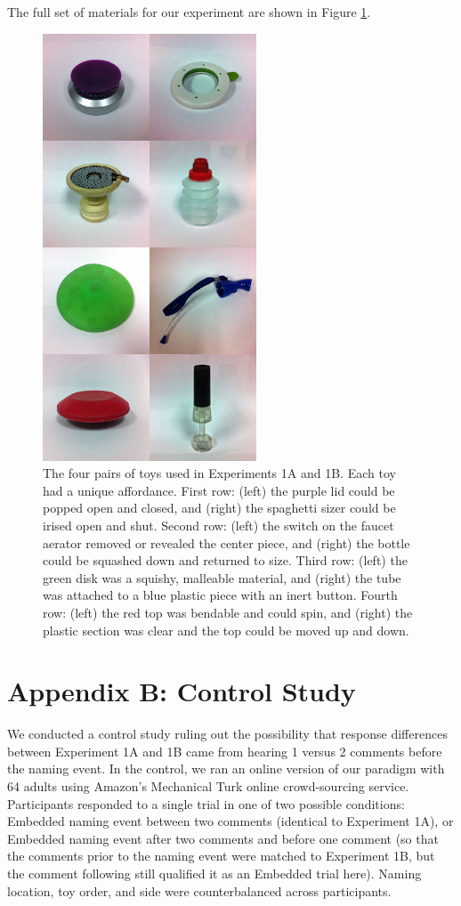 \documentclass[man]{apa2}
\begin{document}
The full set of materials for our experiment are shown in Figure \ref{fig:toys}. 
\begin{figure}
  \begin{center} 
    \includegraphics[width=2.5in]{figures/discourse_toys_images.jpg} 

    \caption{\label{fig:toys} The four pairs of toys used in Experiments 1A and 1B. Each toy had a unique affordance. First row: (left) the purple lid could be popped open and closed, and (right) the spaghetti sizer could be irised open and shut.  Second row: (left) the switch on the faucet aerator removed or revealed the center piece, and (right) the bottle could be squashed down and returned to size.  Third row: (left) the green disk was a squishy, malleable material, and (right) the tube was attached to a blue plastic piece with an inert button.  Fourth row: (left) the red top was bendable and could spin, and (right) the plastic section was clear and the top could be moved up and down. } 

  \end{center} 
\end{figure}

\section{Appendix B: Control Study}

We conducted a control study ruling out the possibility that response differences between Experiment 1A and 1B came from hearing 1 versus 2 comments before the naming event.  In the control, we ran an online version of our paradigm with 64 adults using Amazon's Mechanical Turk online crowd-sourcing service.  Participants responded to a single trial in one of two possible conditions: Embedded naming event between two comments (identical to Experiment 1A), or Embedded naming event after two comments and before one comment (so that the comments prior to the naming event were matched to Experiment 1B, but the comment following still qualified it as an Embedded trial here).  Naming location, toy order, and side were counterbalanced across participants. 
\end{document}
